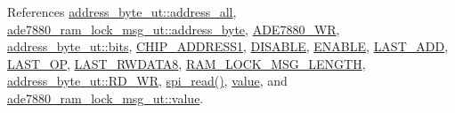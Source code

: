 References \hyperlink{a00040_source_l00023}{address\-\_\-byte\-\_\-ut\-::address\-\_\-all}, \hyperlink{a00040_source_l00189}{ade7880\-\_\-ram\-\_\-lock\-\_\-msg\-\_\-ut\-::address\-\_\-byte}, \hyperlink{a00040_source_l00013}{A\-D\-E7880\-\_\-\-W\-R}, \hyperlink{a00010_ae121725fb28cc26495969d71e0e0d42e}{address\-\_\-byte\-\_\-ut\-::bits}, \hyperlink{a00036_source_l00039}{C\-H\-I\-P\-\_\-\-A\-D\-D\-R\-E\-S\-S1}, \hyperlink{a00036_source_l00041}{D\-I\-S\-A\-B\-L\-E}, \hyperlink{a00036_source_l00040}{E\-N\-A\-B\-L\-E}, \hyperlink{a00035_source_l00314}{L\-A\-S\-T\-\_\-\-A\-D\-D}, \hyperlink{a00035_source_l00316}{L\-A\-S\-T\-\_\-\-O\-P}, \hyperlink{a00035_source_l00048}{L\-A\-S\-T\-\_\-\-R\-W\-D\-A\-T\-A8}, \hyperlink{a00040_source_l00017}{R\-A\-M\-\_\-\-L\-O\-C\-K\-\_\-\-M\-S\-G\-\_\-\-L\-E\-N\-G\-T\-H}, \hyperlink{a00040_source_l00026}{address\-\_\-byte\-\_\-ut\-::\-R\-D\-\_\-\-W\-R}, \hyperlink{a00039_source_l00147}{spi\-\_\-read()}, \hyperlink{a00040_source_l00195}{value}, and \hyperlink{a00040_source_l00191}{ade7880\-\_\-ram\-\_\-lock\-\_\-msg\-\_\-ut\-::value}.


